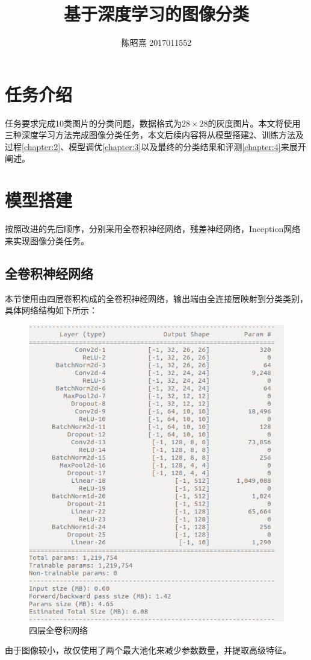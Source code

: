 \documentclass[UTF8]{ctexart}
\begin{document}
\title{基于深度学习的图像分类}
\author{陈昭熹 2017011552}
\maketitle
\tableofcontents
\newpage

\section{任务介绍}
任务要求完成10类图片的分类问题，数据格式为$28\times28$的灰度图片。本文将使用三种深度学习方法完成图像分类任务，本文后续内容将从模型搭建\ref{chapter:1}、训练方法及过程\ref{chapter:2}、模型调优\ref{chapter:3}以及最终的分类结果和评测\ref{chapter:4}来展开阐述。

\section{模型搭建}\label{chapter:1}
按照改进的先后顺序，分别采用全卷积神经网络，残差神经网络，Inception网络来实现图像分类任务。
\subsection{全卷积神经网络}
本节使用由四层卷积构成的全卷积神经网络，输出端由全连接层映射到分类类别，具体网络结构如下所示：
\begin{figure}[H]
    \centering
    \includegraphics[scale=0.4]{../images/cnn4.png}
    \caption{四层全卷积网络}
\end{figure}
由于图像较小，故仅使用了两个最大池化来减少参数数量，并提取高级特征。
\end{document}
